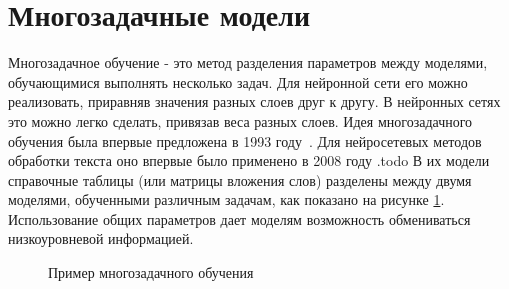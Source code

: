 \section{Многозадачные модели}\label{ch:mtl} 

Многозадачное обучение - это метод разделения параметров между моделями, обучающимися выполнять несколько задач. Для нейронной сети его можно реализовать, приравняв значения разных слоев друг к другу.  В нейронных сетях это можно легко сделать, привязав веса разных слоев.  Идея многозадачного обучения была впервые предложена в 1993 году~\cite{caruana_1997}. Для нейросетевых методов обработки текста оно впервые было применено в 2008 году \cite{collobert_2008}.todo В их модели справочные таблицы (или матрицы вложения слов) разделены между двумя моделями, обученными различным задачам, как показано на рисунке \ref{fig:MTL1}.
Использование общих параметров дает моделям возможность обмениваться низкоуровневой информацией.


\begin{figure}[ht]
  \caption{Пример многозадачного обучения}\label{fig:MTL1}
\end{figure}

